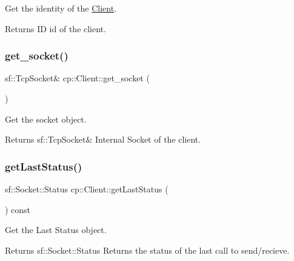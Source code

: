 Get the identity of the \hyperlink{classcp_1_1_client}{Client}. 

\begin{DoxyReturn}{Returns}
ID id of the client. 
\end{DoxyReturn}
\mbox{\label{classcp_1_1_client_a00d100072786f290ef74aa13fa19eb4c}} 
\subsubsection{\texorpdfstring{get\+\_\+socket()}{get\_socket()}}
{\footnotesize\ttfamily sf\+::\+Tcp\+Socket\& cp\+::\+Client\+::get\+\_\+socket (\begin{DoxyParamCaption}{ }\end{DoxyParamCaption})\hspace{0.3cm}{\ttfamily [inline]}}



Get the socket object. 

\begin{DoxyReturn}{Returns}
sf\+::\+Tcp\+Socket\& Internal Socket of the client. 
\end{DoxyReturn}
\mbox{\label{classcp_1_1_client_acbb62103eeab8e6bdf2bd978396b352d}} 
\subsubsection{\texorpdfstring{get\+Last\+Status()}{getLastStatus()}}
{\footnotesize\ttfamily sf\+::\+Socket\+::\+Status cp\+::\+Client\+::get\+Last\+Status (\begin{DoxyParamCaption}{ }\end{DoxyParamCaption}) const\hspace{0.3cm}{\ttfamily [inline]}}



Get the Last Status object. 

\begin{DoxyReturn}{Returns}
sf\+::\+Socket\+::\+Status Returns the status of the last call to send/recieve. 
\end{DoxyReturn}
\mbox{\label{classcp_1_1_client_a7b52fd5525cdb44e6238c617baa08a68}} 
